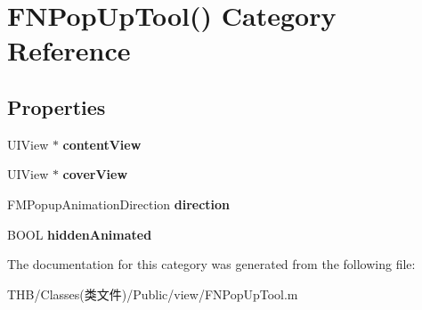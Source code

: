 \hypertarget{category_f_n_pop_up_tool_07_08}{}\section{F\+N\+Pop\+Up\+Tool() Category Reference}
\label{category_f_n_pop_up_tool_07_08}
\subsection*{Properties}
\begin{DoxyCompactItemize}
\item 
\mbox{\label{category_f_n_pop_up_tool_07_08_ad611699870a76264c0d29453dc9dfdd0}} 
U\+I\+View $\ast$ {\bfseries content\+View}
\item 
\mbox{\label{category_f_n_pop_up_tool_07_08_a7b516419f8c3c6938535a0905b291f6c}} 
U\+I\+View $\ast$ {\bfseries cover\+View}
\item 
\mbox{\label{category_f_n_pop_up_tool_07_08_ab21835a7d208269ad412f910aa3a38ed}} 
F\+M\+Popup\+Animation\+Direction {\bfseries direction}
\item 
\mbox{\label{category_f_n_pop_up_tool_07_08_a59f0270fc6f1234e264ea9dd70eb1020}} 
B\+O\+OL {\bfseries hidden\+Animated}
\end{DoxyCompactItemize}


The documentation for this category was generated from the following file\+:\begin{DoxyCompactItemize}
\item 
T\+H\+B/\+Classes(类文件)/\+Public/view/F\+N\+Pop\+Up\+Tool.\+m\end{DoxyCompactItemize}
